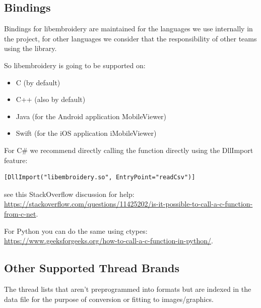 \subsection{Bindings}

Bindings for libembroidery are maintained for the languages we use internally in the project, for other languages we consider that the responsibility of other teams using the library.

So libembroidery is going to be supported on:

\begin{itemize}
\item C (by default)
\item C++ (also by default)
\item Java (for the Android application MobileViewer)
\item Swift (for the iOS application iMobileViewer)
\end{itemize}

For C\# we recommend directly calling the function directly
using the DllImport feature:

\begin{lstlisting}
[DllImport("libembroidery.so", EntryPoint="readCsv")]
\end{lstlisting}

see this StackOverflow discussion for help: \url{https://stackoverflow.com/questions/11425202/is-it-possible-to-call-a-c-function-from-c-net}.

For Python you can do the same using ctypes: \url{https://www.geeksforgeeks.org/how-to-call-a-c-function-in-python/}.

\subsection{Other Supported Thread Brands}

The thread lists that aren't preprogrammed into formats but are indexed in the data file for the purpose of conversion or fitting to images/graphics.

